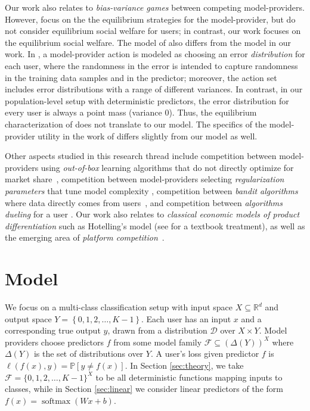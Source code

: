 \documentclass[letterpaper,11pt]{article}
\theoremstyle{plain}
\DeclareMathOperator*{\softmax}{softmax}
\begin{document}
Our work also relates to \textit{bias-variance games} \citep{FGHJN19} between competing model-providers. However, \citet{FGHJN19} focus on the the equilibrium strategies for the model-provider, but do not consider equilibrium social welfare for users; in contrast, our work focuses on the equilibrium social welfare. The model of \citet{FGHJN19} also differs from the model in our work. In \citet{FGHJN19}, a model-provider action is modeled as choosing an error \textit{distribution} for each user, where the randomness in the error is intended to capture randomness in the training data samples and in the predictor; moreover, the action set includes error distributions with a range of different variances. In contrast, in our population-level setup with deterministic predictors, the error distribution for every user is always a point mass (variance 0). Thus, the equilibrium characterization of \citet{FGHJN19} does not translate to our model. The specifics of the model-provider utility in the work of \citet{FGHJN19} differs slightly from our model as well. 

Other aspects studied in this research thread include competition between model-providers using \textit{out-of-box} learning algorithms that do not directly optimize for market share~\citep{GZKZ21, KGZ22, DCRMF22}, competition between model-providers selecting \textit{regularization parameters} that tune model complexity \citep{IK22}, competition between \textit{bandit algorithms} where data directly comes from users~\citep{AMSW20, JJH22}, and competition between \textit{algorithms dueling} for a user \citep{IKLMPT11}. Our work also relates to \textit{classical economic models of product differentiation} such as Hotelling's model \citep{H29, DGT79} (see \citet{ProductDifferentiation} for a textbook treatment), as well as the emerging area of \textit{platform competition}~\citep[see, e.g.,][]{J21, C21}. 



\section{Model}\label{sec:model}

We focus on a multi-class classification setup with input space $X\subseteq \mathbb{R}^d$ and output space $Y = \left\{0,1, 2, \ldots, K-1\right\}$. Each user has an input $x$ and a corresponding true output $y$, drawn from a distribution $\mathcal{D}$ over $X \times Y$. Model providers choose predictors $f$ from some model family $\mathcal{F} \subseteq (\Delta(Y))^X$ where $\Delta(Y)$ is the set of distributions over $Y$. A user's loss given predictor $f$ is $\ell(f(x), y) = \mathbb{P}[y \neq f(x)]$. In Section \ref{sec:theory}, we take $\mathcal{F} = \{0,1, 2, \ldots, K-1\}^X$ to be all deterministic functions mapping inputs to classes, while in Section \ref{sec:linear} we consider linear predictors of the form $f(x) = \softmax(Wx + b)$. 
\end{document}
